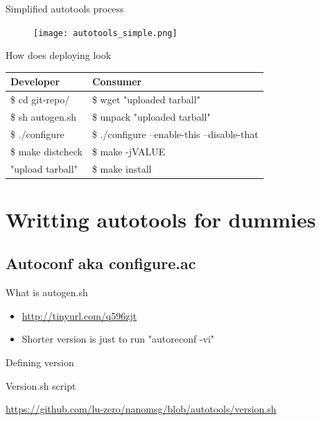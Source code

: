 \documentclass{beamer}
\begin{document}
\begin{frame}{Simplified autotools process}
	\begin{figure}
	\texttt{[image: autotools\_simple.png]}
	\end{figure}
\end{frame}

\begin{frame}{How does deploying look}
	\begin{tabular}{|l|l|}
	\toprule
	Developer & Consumer \\
	\midrule
	\$ cd git-repo/ & \$ wget "uploaded tarball" \\
	\$ sh autogen.sh & \$ unpack "uploaded tarball" \\
	\$ ./configure & \$ ./configure --enable-this --disable-that \\
	\$ make distcheck & \$ make -jVALUE \\
	"upload tarball" & \$ make install \\
	\bottomrule
	\end{tabular}
\end{frame}

\section{Writting autotools for dummies}

\subsection{Autoconf aka configure.ac}

\begin{frame}[t]{What is autogen.sh}
	\begin{itemize}
	\item \url{http://tinyurl.com/q596zjt} \\
	\item Shorter version is just to run "autoreconf -vi"
	\end{itemize}
\end{frame}

\begin{frame}[t]{Defining version}
	\begin{small}
	
	\end{small}
\end{frame}

\begin{frame}{Version.sh script}
	\begin{small}
	\url{https://github.com/lu-zero/nanomsg/blob/autotools/version.sh}
	\end{small}
\end{frame}
\end{document}
